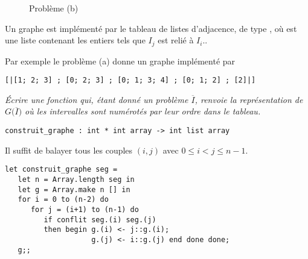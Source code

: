 \begin{figure}[ht]
\centering
{}
\caption{\label{fig:pbb}Problème (b)}
\end{figure} 
Un graphe est implémenté par le tableau  de listes d'adjacence, de type , où  est une liste contenant les entiers  tels que $I_j$ est relié à $I_i$..

Par exemple le problème (a) donne un graphe implémenté par 
\begin{lstlisting}
[|[1; 2; 3] ; [0; 2; 3] ; [0; 1; 3; 4] ; [0; 1; 2] ; [2]|]
\end{lstlisting}
\begin{Exercise}\it
Écrire une fonction  qui, étant donné un problème $\overline I$, renvoie la représentation de $G\bigl(\overline I\bigr)$ où les intervalles sont numérotés par leur ordre dans le tableau.
\end{Exercise}  
\begin{lstlisting}
construit_graphe : int * int array -> int list array
\end{lstlisting}
\begin{Answer}
Il suffit de balayer tous les couples $(i,j)$ avec $0 \le i < j \le n-1$.
\begin{lstlisting}
let construit_graphe seg =
   let n = Array.length seg in
   let g = Array.make n [] in
   for i = 0 to (n-2) do
      for j = (i+1) to (n-1) do
         if conflit seg.(i) seg.(j)
         then begin g.(i) <- j::g.(i); 
                    g.(j) <- i::g.(j) end done done;
   g;;
\end{lstlisting}
\end{Answer}
\newpage
